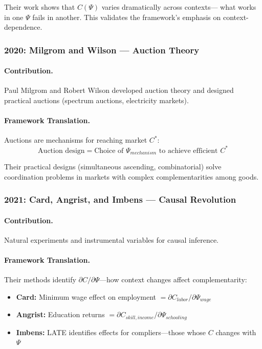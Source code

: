 \documentclass[12pt,a4paper]{article}
\begin{document}
Their work shows that $C(\Psi)$ varies dramatically across contexts---
what works in one $\Psi$ fails in another.
This validates the framework's emphasis on context-dependence.

\subsubsection{2020: Milgrom and Wilson --- Auction Theory}

\paragraph{Contribution.}
Paul Milgrom and Robert Wilson developed auction theory and designed practical auctions
(spectrum auctions, electricity markets).

\paragraph{Framework Translation.}
Auctions are mechanisms for reaching market $C^*$:
\begin{equation}
  \text{Auction design} = \text{Choice of } \Psi_{mechanism} \text{ to achieve efficient } C^*
\end{equation}

Their practical designs (simultaneous ascending, combinatorial) solve
coordination problems in markets with complex complementarities among goods.

\subsubsection{2021: Card, Angrist, and Imbens --- Causal Revolution}

\paragraph{Contribution.}
Natural experiments and instrumental variables for causal inference.

\paragraph{Framework Translation.}
Their methods identify $\partial C / \partial \Psi$---how context changes affect complementarity:
\begin{itemize}
  \item \textbf{Card:} Minimum wage effect on employment $= \partial C_{labor} / \partial \Psi_{wage}$
  \item \textbf{Angrist:} Education returns $= \partial C_{skill,income} / \partial \Psi_{schooling}$
  \item \textbf{Imbens:} LATE identifies effects for compliers---those whose $C$ changes with $\Psi$
\end{itemize}
\end{document}
